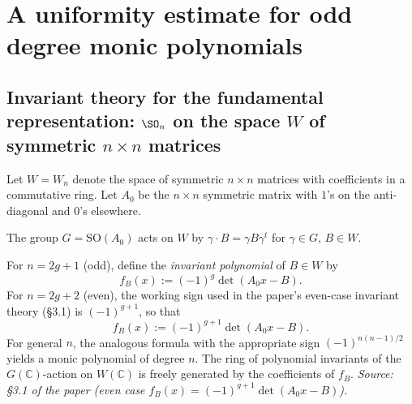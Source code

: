 \section{A uniformity estimate for odd degree monic polynomials}

\subsection{Invariant theory for the fundamental representation:
  $\SO_n$ on the space $W$ of symmetric $n\times n$ matrices}


\begin{definition}
  \label{def:symmetric_matrix_space}
  \uses{}
  Let \(W=W_n\) denote the space of symmetric \(n\times n\) matrices
  with coefficients in a commutative ring.  Let \(A_0\) be the
  \(n\times n\) symmetric matrix with \(1\)'s on the anti-diagonal and
  \(0\)'s elsewhere.
\end{definition}

\begin{definition}
  \label{def:SO_n_action}
  The group \(G=\mathrm{SO}(A_0)\) acts on \(W\) by
  \(\gamma\cdot B=\gamma B\gamma^t\) for \(\gamma\in G\), \(B\in W\).
\end{definition}

\begin{definition}
  \label{def:invariant_polynomial}
  For \(n=2g+1\) (odd), define the \emph{invariant polynomial} of
  \(B\in W\) by
  \[
    f_B(x):=(-1)^{g}\det(A_0 x - B).
  \]
  For \(n=2g+2\) (even), the working sign used in the paper's even-case
  invariant theory (\S3.1) is \((-1)^{g+1}\), so that
  \[
    f_B(x):=(-1)^{g+1}\det(A_0 x - B).
  \]
  For general \(n\), the analogous formula with the appropriate sign
  \((-1)^{n(n-1)/2}\) yields a monic polynomial of degree \(n\).
  The ring of polynomial invariants of the \(G(\mathbb{C})\)-action on
  \(W(\mathbb{C})\) is freely generated by the coefficients of \(f_B\).
  \textit{Source: \S3.1 of the paper (even case
  \(f_B(x)=(-1)^{g+1}\det(A_0x-B)\)).}
\end{definition}

